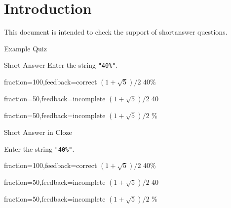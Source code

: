 \documentclass{article}
\def\myequation{$(1+\sqrt{5})/2$}
\begin{document}
\section*{Introduction}

This document is intended to check the support of shortanswer questions.

\begin{quiz}{Example Quiz}

\begin{shortanswer}{Short Answer}
Enter the string \texttt{"40\%"}.
\item[fraction=100,feedback={correct \myequation}] 40\%
\item[fraction=50,feedback={incomplete \myequation}] 40
\item[fraction=50,feedback={incomplete \myequation}] \%
\end{shortanswer}
\begin{cloze}{Short Answer in Cloze}
\begin{shortanswer}
Enter the string \texttt{"40\%"}.
\item[fraction=100,feedback={correct \myequation}] 40\%
\item[fraction=50,feedback={incomplete \myequation}] 40
\item[fraction=50,feedback={incomplete \myequation}] \%
\end{shortanswer}
\end{cloze}

\end{quiz}
\end{document}
